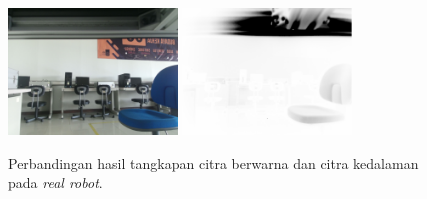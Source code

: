 \begin{figure}[ht]
  \centering
  \includegraphics[width=0.4\textwidth,keepaspectratio]{gambar/citra-depth-camera-rgb-robot.png}
  \includegraphics[width=0.4\textwidth,keepaspectratio]{gambar/citra-depth-camera-depth-robot.png}
  \caption{Perbandingan hasil tangkapan citra berwarna dan citra kedalaman pada \emph{real robot}.}
  \label{fig:depthcamerarobot}
\end{figure}
